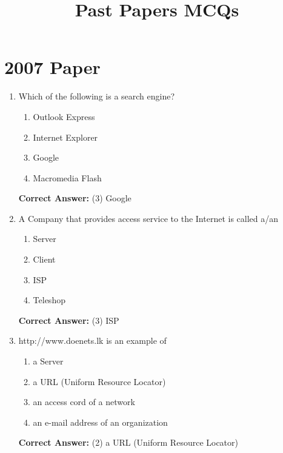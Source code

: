 \documentclass[12pt]{article}
\begin{document}
\title{Past Papers MCQs}
\author{}
\date{}
\maketitle

\section*{2007 Paper}
\begin{enumerate}[label=Q\arabic*:,leftmargin=*,resume]
\item Which of the following is a search engine?\\
\begin{enumerate}[label=(\arabic*)]
\item Outlook Express
\item Internet Explorer
\item Google
\item Macromedia Flash
\end{enumerate}
\textbf{Correct Answer:} (3) Google

\item A Company that provides access service to the Internet is called a/an\\
\begin{enumerate}[label=(\arabic*)]
\item Server
\item Client
\item ISP
\item Teleshop
\end{enumerate}
\textbf{Correct Answer:} (3) ISP

\item http://www.doenets.lk is an example of\\
\begin{enumerate}[label=(\arabic*)]
\item a Server
\item a URL (Uniform Resource Locator)
\item an access cord of a network
\item an e-mail address of an organization
\end{enumerate}
\textbf{Correct Answer:} (2) a URL (Uniform Resource Locator)
\end{enumerate}

\end{document}
